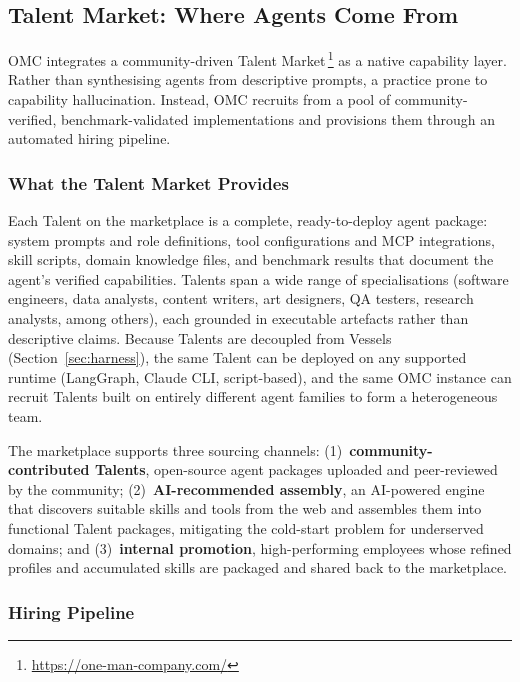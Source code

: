 \documentclass[11pt,a4paper]{article}
\begin{document}
\subsection{Talent Market: Where Agents Come From}
\label{sec:talent-market}

OMC integrates a community-driven Talent Market\,\footnote{\url{https://one-man-company.com/}} as a native capability layer.  Rather than synthesising agents from descriptive prompts, a practice prone to capability hallucination. Instead, OMC recruits from a pool of community-verified, benchmark-validated implementations and provisions them through an automated hiring pipeline.

\subsubsection{What the Talent Market Provides}

Each Talent on the marketplace is a complete, ready-to-deploy agent package: system prompts and role definitions, tool configurations and MCP integrations, skill scripts, domain knowledge files, and benchmark results that document the agent's verified capabilities.  Talents span a wide range of specialisations (software engineers, data analysts, content writers, art designers, QA testers, research analysts, among others), each grounded in executable artefacts rather than descriptive claims.  Because Talents are decoupled from Vessels (Section~\ref{sec:harness}), the same Talent can be deployed on any supported runtime (LangGraph, Claude CLI, script-based), and the same OMC instance can recruit Talents built on entirely different agent families to form a heterogeneous team.

The marketplace supports three sourcing channels: (1)~\textbf{community-contributed Talents}, open-source agent packages uploaded and peer-reviewed by the community; (2)~\textbf{AI-recommended assembly}, an AI-powered engine that discovers suitable skills and tools from the web and assembles them into functional Talent packages, mitigating the cold-start problem for underserved domains; and (3)~\textbf{internal promotion}, high-performing employees whose refined profiles and accumulated skills are packaged and shared back to the marketplace.

\subsubsection{Hiring Pipeline}
\end{document}
